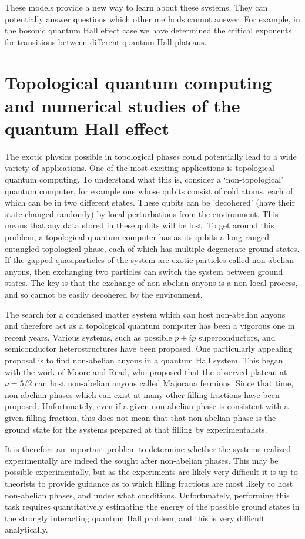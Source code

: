 These models provide a new way to learn about these systems. They can potentially answer questions which other methods cannot answer. For example, in the bosonic quantum Hall effect case we have determined the critical exponents for transitions between different quantum Hall plateaus. 

\section{Topological quantum computing and numerical studies of the quantum Hall effect}

The exotic physics possible in topological phases could potentially lead to a wide variety of applications. One of the most exciting applications is topological quantum computing. To understand what this is, consider a `non-topological' quantum computer, for example one whose qubits consist of cold atoms, each of which can be in two different states. These qubits can be 'decohered' (have their state changed randomly) by local perturbations from the environment. This means that any data stored in these qubits will be lost. To get around this problem, a topological quantum computer has as its qubits a long-ranged entangled topological phase, each of which has multiple degenerate ground states. If the gapped quasiparticles of the system are exotic particles called non-abelian anyons, then exchanging two particles can switch the system between ground states. The key is that the exchange of non-abelian anyons is a non-local process, and so cannot be easily decohered by the environment. 

The search for a condensed matter system which can host non-abelian anyons and therefore act as a topological quantum computer has been a vigorous one in recent years. Various systems, such as possible $p+ip$ superconductors, and semiconductor heterostructures have been proposed. One particularly appealing proposal is to find non-abelian anyons in a quantum Hall system. This began with the work of Moore and Read, who proposed that the observed plateau at $\nu=5/2$ can host non-abelian anyons called Majorana fermions. Since that time, non-abelian phases which can exist at many other filling fractions have been proposed\cite{ReadRezayi,BondersonSlingerland}. Unfortunately, even if a given non-abelian phase is consistent with a given filling fraction, this does not mean that that non-abelian phase is the ground state for the systems prepared at that filling by experimentalists. 

It is therefore an important problem to determine whether the systems realized experimentally are indeed the sought after non-abelian phases. This may be possible experimentally, but as the experiments are likely very difficult it is up to theorists to provide guidance as to which filling fractions are most likely to host non-abelian phases, and under what conditions. Unfortunately, performing this task requires quantitatively estimating the energy of the possible ground states in the strongly interacting quantum Hall problem, and this is very difficult analytically.

